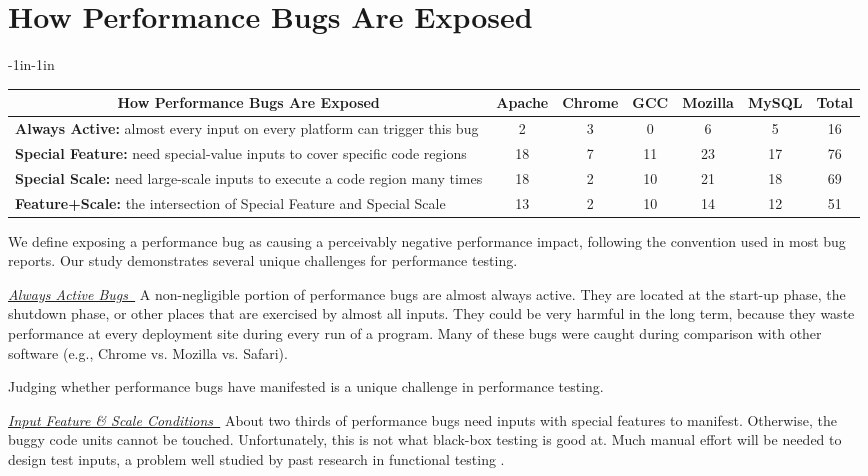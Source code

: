 \section{How Performance Bugs Are Exposed}
\label{sec:3_exp}

\begin{table*}[tb!]
\begin{adjustwidth}{-1in}{-1in}
\scriptsize
\centering
{
\begin{tabular}{lcccccc}
\toprule
\multicolumn{1}{c}{\bf How Performance Bugs Are Exposed} &Apache&Chrome&GCC&Mozilla&MySQL&Total\\
\midrule
\multicolumn{1}{l}{{\bf Always Active:} almost every input on every platform can trigger this bug}
&2&3&0&6&5&16\\
\midrule
\multicolumn{1}{l}{{\bf Special Feature:} need special-value inputs to cover specific code regions}
&18&7&11&23&17&76\\
\midrule
\multicolumn{1}{l}{{\bf Special Scale:} need large-scale inputs to execute a code region many times}
&18&2&10&21&18&69\\
\midrule
\multicolumn{1}{l}{{\bf Feature+Scale:} the intersection of Special Feature and Special Scale}
&13&2&10&14&12&51\\
\bottomrule
\end{tabular}
}
\end{adjustwidth}
\caption{How performance bugs are exposed in Section~\ref{sec:3_exp}.}
\label{tab:3_exp}
\end{table*}


We define exposing a performance bug as causing a perceivably negative performance impact, 
following the convention used in most bug reports. Our study demonstrates several unique challenges for performance testing.

\underline{\it Always Active Bugs\ } 
A non-negligible portion of performance bugs are almost always active.
They are located at the start-up phase, the shutdown phase, or other places 
that are exercised by almost all inputs. 
They could be very harmful in the long term, because
they waste performance at every deployment site during every run of a program.
Many of these bugs were caught during comparison with other software
(e.g., Chrome vs. Mozilla vs. Safari).

Judging whether performance bugs have manifested is a unique challenge in 
performance testing.

\underline{\it Input Feature \& Scale Conditions\ } 
About two thirds of performance bugs need inputs with special features
to manifest. Otherwise, the buggy code units cannot be touched.
Unfortunately, this is not what black-box testing is good at.
Much manual effort will be needed to design test inputs, a problem
well studied by past research in functional testing \citep{KLEE,s2e}.


